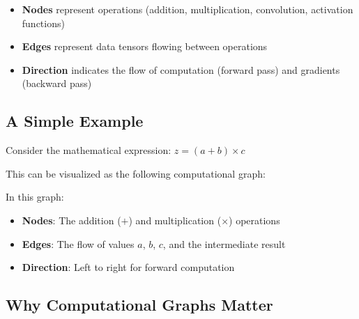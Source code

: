 \documentclass[11pt]{article}
\begin{document}
\begin{itemize}
    \item \textbf{Nodes} represent operations (addition, multiplication, convolution, activation functions)
    \item \textbf{Edges} represent data tensors flowing between operations
    \item \textbf{Direction} indicates the flow of computation (forward pass) and gradients (backward pass)
\end{itemize}

\subsection{A Simple Example}

Consider the mathematical expression: $z = (a + b) \times c$

This can be visualized as the following computational graph:

\begin{center}
\end{center}

In this graph:
\begin{itemize}
    \item \textbf{Nodes}: The addition (\(+\)) and multiplication (\(\times\)) operations
    \item \textbf{Edges}: The flow of values \(a\), \(b\), \(c\), and the intermediate result
    \item \textbf{Direction}: Left to right for forward computation
\end{itemize}

\subsection{Why Computational Graphs Matter}
\end{document}
